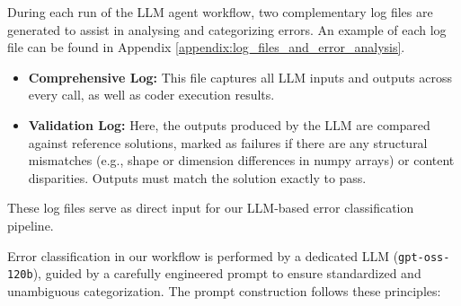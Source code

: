 \documentclass[aps,prd,reprint,superscriptaddress]{revtex4-2}
\begin{document}
During each run of the LLM agent workflow, two complementary log files are generated to assist in analysing and categorizing errors. An example of each log file can be found in Appendix \ref{appendix:log_files_and_error_analysis}.
\begin{itemize}
    \item \textbf{Comprehensive Log:} This file captures all LLM inputs and outputs across every call, as well as coder execution results.
    \item \textbf{Validation Log:} Here, the outputs produced by the LLM are compared against reference solutions, marked as failures if there are any structural mismatches (e.g., shape or dimension differences in numpy arrays) or content disparities. Outputs must match the solution exactly to pass. 
\end{itemize}

These log files serve as direct input for our LLM-based error classification pipeline. 

Error classification in our workflow is performed by a dedicated LLM (\texttt{gpt-oss-120b}), guided by a carefully engineered prompt to ensure standardized and unambiguous categorization. The prompt construction follows these principles:
\end{document}
